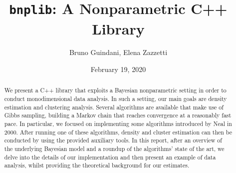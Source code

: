\documentclass[a4paper]{article}
\title{\texttt{bnplib}: A Nonparametric C++ Library}
\author{Bruno Guindani, Elena Zazzetti}
\date{February 19, 2020}
\begin{document}
\maketitle

\begin{abstract}
We present a C++ library that exploits a Bayesian nonparametric setting in order to conduct monodimensional data analysis.
In such a setting, our main goals are density estimation and clustering analysis.
Several algorithms are available that make use of Gibbs sampling, building a Markov chain that reaches convergence at a reasonably fast pace.
In particular, we focused on implementing some algorithms introduced by Neal in 2000.
After running one of these algorithms, density and cluster estimation can then be conducted by using the provided auxiliary tools.
In this report, after an overview of the underlying Bayesian model and a roundup of the algorithms' state of the art, we delve into the details of our implementation and then present an example of data analysis, whilst providing the theoretical background for our estimates.
\end{abstract}




\end{document}
